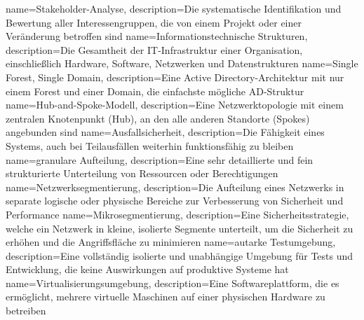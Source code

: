 {
	name={Stake\-hol\-der-Ana\-ly\-se},
	description={Die sys\-te\-ma\-ti\-sche Iden\-ti\-fi\-ka\-ti\-on und Be\-wer\-tung al\-ler In\-ter\-es\-sen\-grup\-pen, die von ei\-nem Pro\-jekt oder ei\-ner Ver\-än\-de\-rung be\-trof\-fen sind}
}
{
	name={In\-for\-ma\-ti\-ons\-tech\-ni\-sche Struk\-tu\-ren},
	description={Die Ge\-samt\-heit der IT-In\-fra\-struk\-tur ei\-ner Or\-ga\-ni\-sa\-ti\-on, ein\-schließ\-lich Hard\-ware, Soft\-ware, Netz\-wer\-ken und Da\-ten\-struk\-tu\-ren}
}
{
	name={Sin\-gle Fo\-rest, Sin\-gle Do\-main},
	description={Eine Ac\-tive Di\-rec\-to\-ry-Ar\-chi\-tek\-tur mit nur ei\-nem Fo\-rest und ei\-ner Do\-main, die ein\-fachs\-te mög\-li\-che AD-Struk\-tur}
}
{
	name={Hub-and-Spoke-Mo\-dell},
	description={Eine Netz\-werk\-to\-po\-lo\-gie mit ei\-nem zen\-tra\-len Kno\-ten\-punkt (Hub), an den alle an\-de\-ren Stand\-or\-te (Spo\-kes) an\-ge\-bun\-den sind}
}
{
	name={Aus\-fall\-si\-cher\-heit},
	description={Die Fä\-hig\-keit ei\-nes Sys\-tems, auch bei Teil\-aus\-fäl\-len wei\-ter\-hin funk\-ti\-ons\-fä\-hig zu blei\-ben}
}
{
	name={gra\-nu\-la\-re Auf\-tei\-lung},
	description={Eine sehr de\-tail\-lier\-te und fein struk\-tu\-rier\-te Un\-ter\-tei\-lung von Res\-sour\-cen oder Be\-rech\-ti\-gun\-gen}
}
{
	name={Netz\-werk\-seg\-men\-tie\-rung},
	description={Die Auf\-tei\-lung ei\-nes Netz\-werks in se\-pa\-ra\-te lo\-gi\-sche oder phy\-si\-sche Be\-rei\-che zur Ver\-bes\-se\-rung von Si\-cher\-heit und Per\-for\-mance}
}
{
	name={Mi\-kro\-seg\-men\-tie\-rung},
	description={Eine Si\-cher\-heits\-stra\-te\-gie, wel\-che ein Netz\-werk in klei\-ne, iso\-lier\-te Seg\-men\-te un\-ter\-teilt, um die Si\-cher\-heit zu er\-hö\-hen und die An\-griffs\-flä\-che zu mi\-ni\-mie\-ren}
}
{
	name={au\-tar\-ke Test\-um\-ge\-bung},
	description={Eine voll\-stän\-dig iso\-lier\-te und un\-ab\-hän\-gi\-ge Um\-ge\-bung für Tests und Ent\-wick\-lung, die kei\-ne Aus\-wir\-kun\-gen auf pro\-duk\-ti\-ve Sys\-te\-me hat}
}
{
	name={Vir\-tu\-a\-li\-sie\-rungs\-um\-ge\-bung},
	description={Eine Soft\-ware\-platt\-form, die es er\-mög\-licht, meh\-re\-re vir\-tu\-el\-le Ma\-schi\-nen auf ei\-ner phy\-si\-schen Hard\-ware zu be\-trei\-ben}
}
